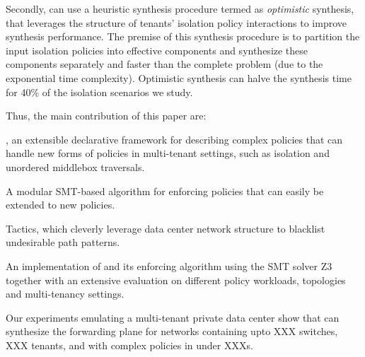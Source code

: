  Secondly, \Name can use a heuristic synthesis procedure termed as
 \emph{optimistic} synthesis, that leverages the structure of tenants'
 isolation policy interactions to improve synthesis performance. The
 premise of this synthesis procedure is to partition the input
 isolation policies into effective components and synthesize these
 components separately and faster than the complete problem (due to
 the exponential time complexity). Optimistic synthesis can halve the
 synthesis time for 40\% of the isolation scenarios we study. 


Thus, the main contribution of this paper are: 
\begin{compactitemize}
\item \Name, an extensible declarative framework for describing
  complex policies that can handle new forms of policies in
  multi-tenant settings, such as isolation and unordered middlebox
  traversals.
\item A modular SMT-based algorithm for enforcing \Name policies that
  can easily be extended to new policies.
\item Tactics, which cleverly leverage data center network structure
  to blacklist undesirable path patterns. %
\item An implementation of \Name and its enforcing algorithm using the SMT
		solver Z3 together with an extensive evaluation on different policy workloads, topologies and multi-tenancy settings.
                \item Our experiments emulating a multi-tenant private
                  data center show that \Name can synthesize the
                  forwarding plane for networks containing upto XXX
                  switches, XXX tenants, and with complex policies in
                  under XXXs. 
\end{compactitemize}

